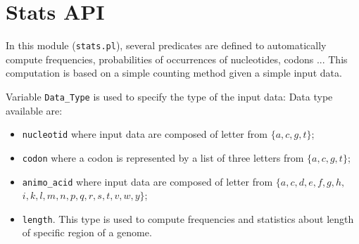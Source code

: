 \documentclass{book}
\begin{document}
\section{Stats API}

In this module (\texttt{stats.pl}), several predicates are defined to automatically compute
frequencies, probabilities of occurrences of nucleotides, codons ... This computation
is based on a simple counting method given a simple input data. 

Variable \texttt{Data\_Type} is used to specify the type of the input data:
Data type available are:
\begin{itemize}
\item \texttt{nucleotid} where input data are composed of letter from $\{a,c,g,t\}$;
\item \texttt{codon} where a codon is represented by a list of three letters from $\{a,c,g,t\}$;
\item \texttt{animo\_acid} where input data are composed of letter from $\{a,c,d,e,f,g,h,$\\
$i,k,l,m,n,p,q,r,s,t,v,w,y\}$;
\item \texttt{length}. This type is used to compute frequencies and statistics about length of specific region of a genome. 
\end{itemize} 
\end{document}
